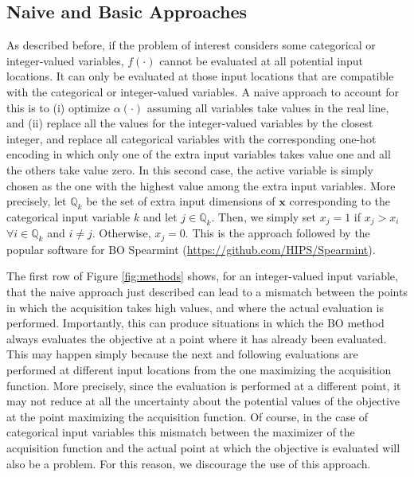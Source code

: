 \subsection{Naive and Basic Approaches}
\label{sec:basic_naive}

As described before, if the problem of interest considers some categorical or integer-valued variables, $f(\cdot)$
cannot be evaluated at all potential input locations. It can only be evaluated at those input locations that are 
compatible with the categorical or integer-valued variables. A naive approach to account for this 
is to (i) optimize $\alpha(\cdot)$ assuming all variables take values in the real line, and (ii) replace all 
the values for the integer-valued variables by the closest integer, and replace all categorical  variables 
with the corresponding one-hot encoding in which only one of the extra input variables takes value one and
all the others take value zero. In this second case, the active variable is simply chosen as the one 
with the highest value among the extra input variables. More precisely, let $\mathds{Q}_k$ be the set of 
extra input dimensions of $\mathbf{x}$ corresponding to the categorical input variable $k$ and let $j\in \mathds{Q}_k$. Then, we 
simply set $x_j = 1$ if $x_j > x_i$ $\forall i \in \mathds{Q}_k$ and $i \neq j$. Otherwise, $x_j = 0$. This is the 
approach followed by the popular software for BO Spearmint ({\small \url{https://github.com/HIPS/Spearmint}}). 

The first row of Figure \ref{fig:methods} shows, for an integer-valued input variable, that the naive approach 
just described can lead to a mismatch between the points in which the acquisition takes high values, and where the actual evaluation 
is performed. Importantly, this can produce situations in which the BO method always evaluates the objective 
at a point where it has already been evaluated. This may happen simply because the next and following 
evaluations are performed at different input locations from the one maximizing the acquisition function.
More precisely, since the evaluation is performed at a different point, it may not reduce at all the 
uncertainty about the potential values of the objective at the point maximizing the acquisition function.
Of course, in the case of categorical input variables this mismatch between the maximizer of the acquisition
function and the actual point at which the objective is evaluated will also be a problem. For this reason, 
we discourage the use of this approach.

